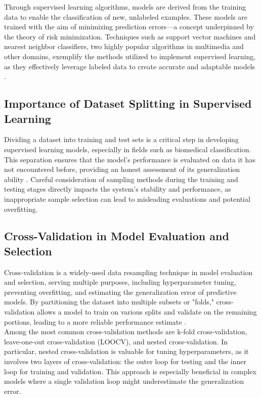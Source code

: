 \documentclass{article}
\begin{document}
Through supervised learning algorithms, models are derived from the training data to enable the classification of new, unlabeled examples. These models are trained with the aim of minimizing prediction errors—a concept underpinned by the theory of risk minimization. Techniques such as support vector machines and nearest neighbor classifiers, two highly popular algorithms in multimedia and other domains, exemplify the methods utilized to implement supervised learning, as they effectively leverage labeled data to create accurate and adaptable models \cite{Cunningham2008}.\\

\subsection{Importance of Dataset Splitting in Supervised Learning}

Dividing a dataset into training and test sets is a critical step in developing supervised learning models, especially in fields such as biomedical classification. This separation ensures that the model's performance is evaluated on data it has not encountered before, providing an honest assessment of its generalization ability \cite{https://doi.org/10.1155/2020/2836236}. Careful consideration of sampling methods during the training and testing stages directly impacts the system's stability and performance, as inappropriate sample selection can lead to misleading evaluations and potential overfitting.


\subsection{Cross-Validation in Model Evaluation and Selection}

Cross-validation is a widely-used data resampling technique in model evaluation and selection, serving multiple purposes, including hyperparameter tuning, preventing overfitting, and estimating the generalization error of predictive models. By partitioning the dataset into multiple subsets or "folds," cross-validation allows a model to train on various splits and validate on the remaining portions, leading to a more reliable performance estimate \cite{berrar2019cross}.
\\

Among the most common cross-validation methods are k-fold cross-validation, leave-one-out cross-validation (LOOCV), and nested cross-validation. In particular, nested cross-validation is valuable for tuning hyperparameters, as it involves two layers of cross-validation: the outer loop for testing and the inner loop for training and validation. This approach is especially beneficial in complex models where a single validation loop might underestimate the generalization error.
\\
\end{document}
